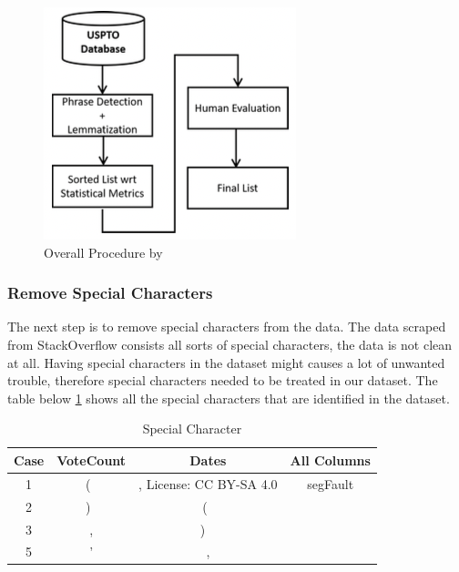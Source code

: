 \begin{figure}[H]
  \centering \includegraphics[scale=0.87]{assets/stopwords_2_overall.png}
\caption{Overall Procedure by \protect{}}\label{fig:overall_procedure_stopwords_curation}
\end{figure}

\subsubsection{Remove Special Characters}
The next step is to remove special characters from the data. The data scraped from StackOverflow consists all sorts of special characters, the data is not clean at all. Having special characters in the dataset might causes a lot of unwanted trouble, therefore special characters needed to be treated in our dataset. The table below \ref{table:special_character} shows all the special characters that are identified in the dataset. 

\begin{table}[ht]
  
  \centering %
  \begin{tabular}{c c c c} %
  \hline\hline %
  Case & VoteCount & Dates & All Columns \\ [0.5ex] %
  \hline %
  1 & ( \, & , License: CC BY-SA 4.0 & segFault \\ %
  2 & ) \, & ( \, &  \\
  3 & , & ) \ &  \\
  5 & ' & , & \\ [1ex] %
  \hline %
  \end{tabular}
  \label{table:special_character} %

  \caption{Special Character} %
\end{table}

